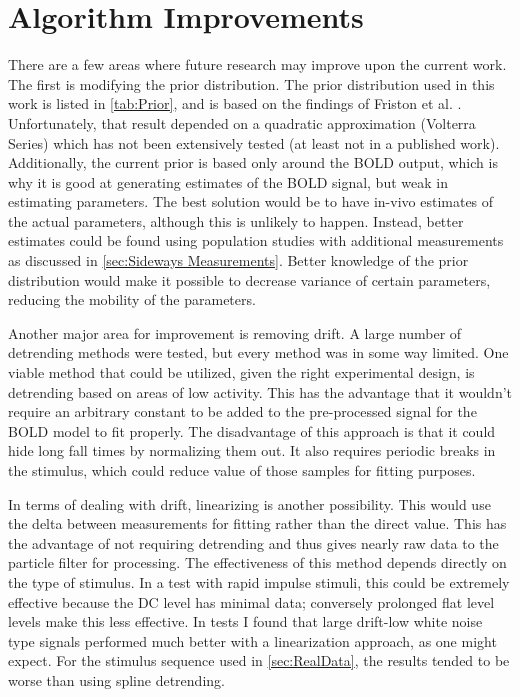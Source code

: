 \section{Algorithm Improvements}
\label{sec:Particle Filter Variations}
There are a few areas where future research may improve upon the current
work. The first is modifying the prior 
distribution. The prior distribution used in this work is listed in \autoref{tab:Prior}, 
and is based on the findings of Friston et al. \cite{Friston2000}. Unfortunately, that
result depended on a quadratic approximation (Volterra Series) which has
not been extensively tested (at least not in a published work). 
Additionally, the current prior is
based only around the BOLD output, which is why it is good at generating
estimates of the BOLD signal, but weak in estimating parameters. 
The best solution would be to have
in-vivo estimates of the actual parameters, although this
is unlikely to happen. Instead, better estimates could be found
using population studies with additional measurements as discussed in 
\autoref{sec:Sideways Measurements}. Better knowledge of the prior distribution
would make it possible to decrease variance of certain 
parameters, reducing the mobility of the parameters.

Another major area for improvement is removing drift. 
A large number of detrending methods were tested, but every method was in some way limited. 
One viable method that could be utilized, given the right experimental design, is detrending
based on areas of low activity. This has the advantage that it wouldn't require an arbitrary
constant to be added to the pre-processed signal for the BOLD model to fit properly.
The disadvantage of this approach is that it could hide long fall times by normalizing them
out. It also requires periodic breaks in the stimulus, which could reduce value of those
samples for fitting purposes. 

In terms of dealing with drift, linearizing is another possibility.
This would use the delta between measurements for fitting rather than the 
direct value. This has the advantage of not requiring detrending and thus 
gives nearly raw data to the particle filter
for processing. The effectiveness of this method depends directly on the type of stimulus.
In a test with rapid impulse stimuli, this could be extremely effective because
the DC level has minimal data; conversely prolonged flat level levels make this less effective.
In tests I found that large drift-low white noise
type signals performed much better with a linearization approach, as one might expect. 
For the stimulus sequence used in \autoref{sec:RealData}, the results tended to be worse
than using spline detrending.

